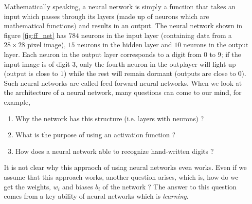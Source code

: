 Mathematically speaking, a neural network is simply a function that takes an input which passes through
its layers (made up of neurons which are mathematical functions) and results in an output. The neural 
network shown in figure \ref{fig:ff_net} has $784$ neurons in the input layer (containing data from a $28 \times 28$ pixel image), $15$
neurons in the hidden layer and $10$ neurons in the output layer. Each neuron in the output layer corresponds to a digit from $0$ to $9$; if
the input image is of digit $3$, only the fourth neuron in the outplayer will light up (output is close to $1$) while the rest will remain dormant (outputs are close to $0$).
Such neural networks are called feed-forward neural networks. When we look at the architecture of a neural network, many questions can 
come to our mind, for example, 
\begin{enumerate}
    \item Why the network has this structure (i.e. layers with neurons) ?
    \item What is the purpose of using an activation function ?
    \item How does a neural network able to recognize hand-written digits ?
\end{enumerate} 
It is not clear why this appraoch of using neural networks even works. Even if we assume that this approach works, another question arises,
which is, how do we get the weights, $w_i$ and biases $b_i$ of the network ? The answer to this question
comes from a key ability of neural networks which is \emph{learning}.

